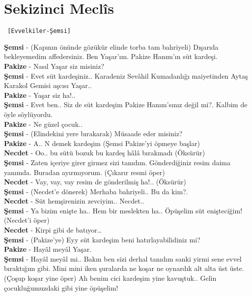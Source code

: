 \documentclass[]{book}
\begin{document}
\hypertarget{sekizinci-meclis}{%
\section{Sekizinci Meclîs}\label{sekizinci-meclis}}

\begin{verbatim}
 [Evvelkiler-Şemsi]
\end{verbatim}

\textbf{Şemsi} - (Kapının önünde gözükür elinde torba tam bahriyeli) Dışarıda bekleyemedim affedersiniz. Ben Yaşar'ım. Pakize Hanım'ın süt kardeşi.\\
\textbf{Pakize} - Nasıl Yaşar siz misiniz?\\
\textbf{Şemsi} - Evet süt kardeşiniz.. Karadeniz Sevâhil Kumadanlığı maiyetinden Aytaş Karakol Gemisi aşcısı Yaşar..\\
\textbf{Pakize} - Yaşar siz ha!..\\
\textbf{Şemsi} - Evet ben.. Siz de süt kardeşim Pakize Hanım'sınız değil mi?. Kalbim de öyle söylüyordu.\\
\textbf{Pakize} - Ne güzel çocuk..\\
\textbf{Şemsi} - (Elindekini yere bırakarak) Müsaade eder misiniz?\\
\textbf{Pakize} - A.. N demek kardeşim (Şemsi Pakize'yi öpmeye başlar)\\
\textbf{Necdet} - Oo.. bu sütü bozuk bu kardeş hâlâ bırakmadı (Öksürür)\\
\textbf{Şemsi} - Zaten içeriye girer girmez sizi tanıdım. Gönderdiğiniz resim daima yanımda. Buradan ayırmıyorum. (Çıkarır resmi öper)\\
\textbf{Necdet} - Vay, vay, vay resim de gönderilmiş ha!.. (Öksürür)\\
\textbf{Şemsi} - (Necdet'e dönerek) Merhaba bahriyeli.. Bu da kim?.\\
\textbf{Necdet} - Süt hemşirenizin zevciyim.. Necdet..\\
\textbf{Şemsi} - Ya bizim enişte ha.. Hem bir meslekten ha.. Öpüşelim süt enişteciğim! (Necdet'i öper)\\
\textbf{Necdet} - Kirpi gibi de batıyor\ldots{}\\
\textbf{Şemsi} - (Pakize'ye) Eyy süt kardeşim beni hatırlayabilidiniz mi?\\
\textbf{Pakize} - Hayâl meyâl Yaşar.\\
\textbf{Şemsi} - Hayâl meyâl mi.. Bakın ben sizi derhal tanıdım sanki yirmi sene evvel bıraktığım gibi. Mini mini iken şuralarda ne koşar ne oynardık alt alta üst üste. (Çoşup koşar yine öper) Ah benim cici kardeşim yine kavuştuk.. Gelin çocukluğumuzdaki gibi yine öpüşelim!\\
\end{document}
